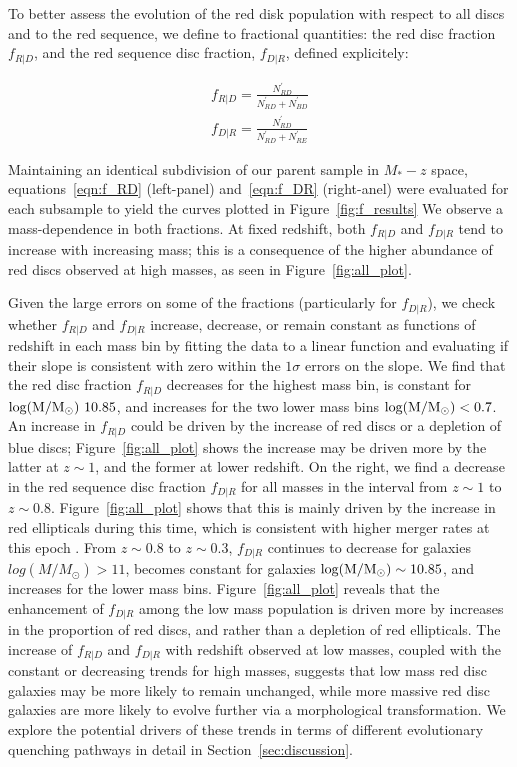 \documentclass[useAMS,usenatbib]{mn2e}
\begin{document}
To better assess the evolution of the red disk population with respect to all discs and to the red sequence, we define to fractional quantities: the red disc fraction $f_{R|D}$, and the red sequence disc fraction, $f_{D|R}$, defined explicitely:

\begin{align}
f_{R|D} = \frac{N^{'}_{RD}}{N^{'}_{RD}+N^{'}_{BD}} \label{eqn:f_RD}\\
f_{D|R} = \frac{N^{'}_{RD}}{N^{'}_{RD}+N^{'}_{RE}}
\label{eqn:f_DR}
\end{align}


Maintaining an identical subdivision of our parent sample in $M_{*}-z$ space, equations~\ref{eqn:f_RD} (left-panel) and~\ref{eqn:f_DR} (right-anel) were evaluated for each subsample to yield the curves plotted in Figure~\ref{fig:f_results} We observe a mass-dependence in both fractions. At fixed redshift, both $f_{R|D}$ and $f_{D|R}$ tend to increase with increasing mass; this is a consequence of the higher abundance of red discs observed at high masses, as seen in Figure~\ref{fig:all_plot}. 

Given the large errors on some of the fractions (particularly for $f_{D|R}$), we check whether $f_{R|D}$ and $f_{D|R}$ increase, decrease, or remain constant as functions of redshift in each mass bin by fitting the data to a linear function and evaluating if their slope is consistent with zero within the $1 \sigma$ errors on the slope. We find that the red disc fraction $f_{R|D}$ decreases for the highest mass bin, is constant for $\rm log(M/M_{\odot})~10.85$, and increases for the two lower mass bins $\rm log(M/M_{\odot})<0.7$. An increase in $f_{R|D}$ could be driven by the increase of red discs or a depletion of blue discs; Figure~\ref{fig:all_plot} shows the increase may be driven more by the latter at $z\sim1$, and the former at lower redshift. On the right, we find a decrease in the red sequence disc fraction $f_{D|R}$ for all masses in the interval from $z\sim1$ to $z\sim0.8$. Figure~\ref{fig:all_plot} shows that this is mainly driven by the increase in red ellipticals during this time, which is consistent with higher merger rates at this epoch \citep{Molina2016}. From $z\sim0.8$ to $z\sim0.3$, $f_{D|R}$ continues to decrease for galaxies $log(M/M_{\odot})>11$, becomes constant for galaxies $\rm log(M/M_{\odot})\sim10.85$, and increases for the lower mass bins. Figure~\ref{fig:all_plot} reveals that the enhancement of $f_{D|R}$ among the low mass population is driven more by increases in the proportion of red discs, and rather than a depletion of red ellipticals. The increase of $f_{R|D}$ and $f_{D|R}$ with redshift observed at low masses, coupled with the constant or decreasing trends for high masses, suggests that low mass red disc galaxies may be more likely to remain unchanged, while more massive red disc galaxies are more likely to evolve further via a morphological transformation. We explore the potential drivers of these trends in terms of different evolutionary quenching pathways in detail in Section~\ref{sec:discussion}.
\end{document}
